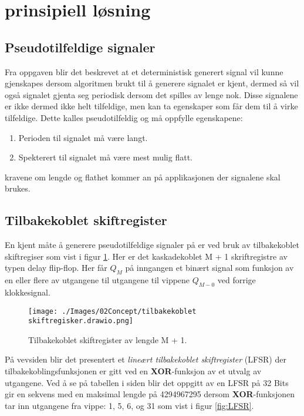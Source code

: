 \section{prinsipiell løsning}
\label{sec:concept}


\subsection{Pseudotilfeldige signaler}
\label{sec:psedutolfeldigesig}

Fra oppgaven \cite{ntnu_2022_designprosjekt} blir det beskrevet at et deterministisk generert signal vil kunne gjenskapes dersom algoritmen brukt til å generere signalet er kjent, dermed så vil også signalet gjenta seg periodisk dersom det spilles av lenge nok. Disse signalene er ikke dermed ikke helt tilfeldige, men kan ta egenskaper som får dem til å virke tilfeldige. Dette kalles pseudotilfeldig og må oppfylle egenskapene:

\begin{enumerate}
    \item Perioden til signalet må være langt.
    \item Spekterert til signalet må være mest mulig flatt.
\end{enumerate}

kravene om lengde og flathet kommer an på applikasjonen der signalene skal brukes.

\subsection{Tilbakekoblet skiftregister}
\label{sec:tilbakekobling}

En kjent måte å generere pseudotilfeldige signaler på er ved bruk av tilbakekoblet skiftregiser som vist i figur \ref{fig:tilbakekoblet}. Her er det kaskadekoblet M + 1 skriftregistre av typen delay flip-flop. Her får $Q_M$ på inngangen et binært signal som funksjon av en eller flere av utgangene til utgangene til vippene $Q_{M-0}$ ved forrige klokkesignal.

\begin{figure}[!hbt]
	\centering
	\texttt{[image: ./Images/02Concept/tilbakekoblet skiftregisker.drawio.png]}
	\caption{Tilbakekoblet skiftregister av lengde M + 1.}
	\label{fig:tilbakekoblet}
\end{figure}

På vevsiden \cite{maxfield_2006_ee} blir det presentert et \textit{lineært tilbakekoblet skiftregister} (LFSR) der tilbakekoblingsfunksjonen er gitt ved en \textbf{XOR}-funksjon av et utvalg av utgangene. Ved å se på tabellen i siden blir det oppgitt av en LFSR på 32 Bits gir en sekvens med en maksimal lengde på 4294967295 dersom \textbf{XOR}-funksjonen tar inn utgangene fra vippe: 1, 5, 6, og 31 som vist i figur \ref{fig:LFSR}.


